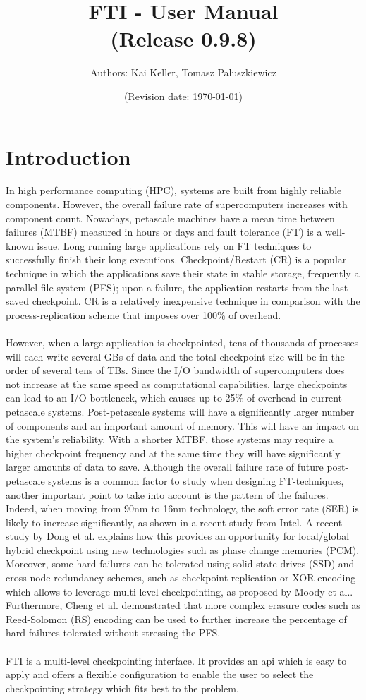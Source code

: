 \documentclass{refrep}
\title{FTI - User Manual  \\ {\small(Release 0.9.8)}}
\author{Authors: Kai Keller, Tomasz Paluszkiewicz}
\date{\small (Revision date: \today)}
\begin{document}
\maketitle
\tableofcontents
\newpage
\chapter{Introduction}\label{ch:introduction}
In high performance computing (HPC), systems are built from highly reliable components. However, the overall failure rate of supercomputers increases with component count. Nowadays, petascale machines have a mean time between failures (MTBF) measured in hours or days and fault tolerance (FT) is a well-known issue. Long running large applications rely on FT techniques to successfully finish their long executions. Checkpoint/Restart (CR) is a popular technique in which the applications save their state in stable storage, frequently a parallel file system (PFS); upon a failure, the application restarts from the last saved checkpoint. CR is a relatively inexpensive technique in comparison with the process-replication scheme that imposes over 100\% of overhead.
\\{}\\
However, when a large application is checkpointed, tens of thousands of processes will each write several GBs of data and the total checkpoint size will be in the order of several tens of TBs. Since the I/O bandwidth of supercomputers does not increase at the same speed as computational capabilities, large checkpoints can lead to an I/O bottleneck, which causes up to 25\% of overhead in current petascale systems. Post-petascale systems will have a significantly larger number of components and an
important amount of memory. This will have an impact on the system's reliability. With a shorter MTBF, those systems may require a higher checkpoint frequency and at the same time they will have significantly larger amounts of data to save. Although the overall failure rate of future post-petascale systems is a common factor to study when designing FT-techniques, another important point to take into account is the pattern of the failures. Indeed, when moving from 90nm to 16nm technology, the soft error rate (SER) is likely to increase significantly, as shown in a recent study from Intel. A recent study by Dong et al. explains how this provides an opportunity for local/global hybrid checkpoint using new technologies such as phase change memories (PCM). Moreover, some hard failures can be tolerated using solid-state-drives (SSD) and cross-node redundancy schemes, such as checkpoint replication or XOR encoding which allows to leverage multi-level checkpointing, as proposed by Moody et al.. Furthermore, Cheng et al. demonstrated that more complex erasure codes such as Reed-Solomon (RS) encoding can be used to further increase the percentage of hard failures tolerated without stressing the PFS.
\\{}\\
FTI is a multi-level checkpointing interface. It provides an api which is easy to apply and offers a flexible configuration to enable the user to select the checkpointing strategy which fits best to the problem.
\end{document}
